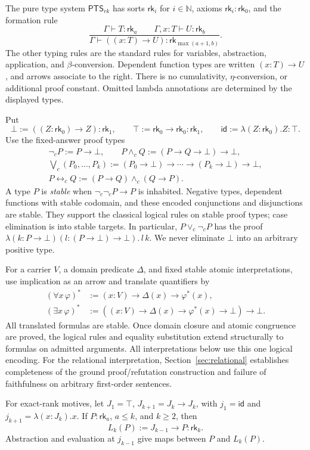 \documentclass[11pt,a4paper]{article}
\newcommand{\rk}[1]{\mathsf{rk}_{#1}}
\newcommand{\PTS}{\mathsf{PTS}_{rk}}
\newcommand{\nc}{\mathop{\neg}\nolimits_c}
\newcommand{\ac}{\mathbin{\wedge_c}}
\newcommand{\oc}{\mathbin{\vee_c}}
\newcommand{\iffc}{\mathbin{\leftrightarrow_c}}
\theoremstyle{remark}\newtheorem*{remark}{Remark}
\begin{document}
The pure type system $\PTS$ has sorts $\rk i$ for $i\in\mathbb N$, axioms
$\rk i:\rk0$, and the formation rule
\[
 \frac{\Gamma\vdash T:\rk a\qquad\Gamma,x:T\vdash U:\rk b}
      {\Gamma\vdash((x:T)\to U):\rk{\max(a+1,b)}}.
\]
The other typing rules are the standard rules for variables, abstraction,
application, and $\beta$-conversion. Dependent function types are written
$(x:T)\to U$, and arrows associate to the right. There is no cumulativity,
$\eta$-conversion, or additional proof constant. Omitted lambda annotations
are determined by the displayed types.

Put
\[
 \bot:=((Z:\rk0)\to Z):\rk1,\qquad
 \top:=\rk0\to\rk0:\rk1,\qquad
 \mathsf{id}:=\lambda(Z:\rk0).Z:\top.
\]
Use the fixed-answer proof types
\begin{gather*}
 \nc P:=P\to\bot,\qquad
 P\ac Q:=(P\to Q\to\bot)\to\bot,\\
 \bigvee_c(P_0,\ldots,P_k):=
 (P_0\to\bot)\to\cdots\to(P_k\to\bot)\to\bot,\\
 P\iffc Q:=(P\to Q)\ac(Q\to P).
\end{gather*}
A type $P$ is \emph{stable} when $\nc\nc P\to P$ is inhabited.
Negative types, dependent functions with stable codomain, and these encoded
conjunctions and disjunctions are stable. They support the classical logical
rules on stable proof types; case elimination is into stable targets.
In particular, $P\oc\nc P$ has the proof
$\lambda(k:P\to\bot)(l:(P\to\bot)\to\bot).\,l\,k$.
We never eliminate $\bot$ into an arbitrary positive type.

For a carrier $V$, a domain predicate $\Delta$, and fixed stable atomic
interpretations, use implication as an arrow and translate quantifiers by
\begin{align*}
 (\forall x\,\varphi)^*&:=(x:V)\to\Delta(x)\to\varphi^*(x),\\
 (\exists x\,\varphi)^*&:=
 ((x:V)\to\Delta(x)\to\varphi^*(x)\to\bot)\to\bot.
\end{align*}
All translated formulas are stable. Once domain closure and atomic
congruence are proved, the logical rules and equality substitution extend
structurally to formulas on admitted arguments. All interpretations below
use this one logical encoding. For the relational interpretation,
Section~\ref{sec:relational} establishes completeness of the ground
proof/refutation construction and failure of faithfulness on arbitrary
first-order sentences.

For exact-rank motives, let $J_1=\top$, $J_{k+1}=J_k\to J_k$, with
$j_1=\mathsf{id}$ and $j_{k+1}=\lambda(x:J_k).x$.
If $P:\rk a$, $a\le k$, and $k\ge2$, then
\[
 L_k(P):=J_{k-1}\to P:\rk k.
\]
Abstraction and evaluation at $j_{k-1}$ give maps between $P$ and $L_k(P)$.
\end{document}
